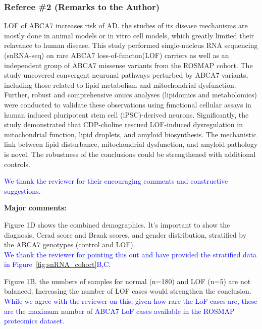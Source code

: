 \subsubsection*{Referee \#2 (Remarks to the Author)}
LOF of ABCA7 increases risk of AD. the studies of its disease mechanisms are mostly done in animal models or in vitro cell models, which greatly limited their relavance to human disease. This study performed single-nucleus RNA sequencing (snRNA-seq) on rare ABCA7 loss-of-functon(LOF) carriers as well as an independent group of ABCA7 missense variants from the ROSMAP cohort. The study uncovered convergent neuronal pathways perturbed by ABCA7 variants, including those related to lipid metabolism and mitochondrial dysfunction. Further, robust and comprehensive omics analyses (lipidomics and metabolomics) were conducted to validate these observations using functional cellular assays in human induced pluripotent stem cell (iPSC)-derived neurons. Significantly, the study demonstrated that CDP-choline rescued LOF-induced dysregulation in mitochondrial function, lipid droplets, and amyloid biosynthesis. The mechanistic link between lipid disturbance, mitochondrial dysfunction, and amyloid pathology is novel. The robustness of the conclusions could be strengthened with additional controls.

\textcolor{blue}{We thank the reviewer for their encouraging comments and constructive suggestions.}

\textbf{Major comments:}

Figure 1D shows the combined demographics. It’s important to show the diagnosis, Cerad score and Braak scores, and gender distribution, stratified by the ABCA7 genotypes (control and LOF).\\
\textcolor{blue}{We thank the reviewer for pointing this out and have provided the stratified data in Figure~\ref{fig:snRNA_cohort}B,C.}

Figure 1B, the numbers of samples for normal (n=180) and LOF (n=5) are not balanced. Increasing the number of LOF cases would strengthen the conclusion.\\
\textcolor{blue}{While we agree with the reviewer on this, given how rare the LoF cases are, these are the maximum number of ABCA7 LoF cases available in the ROSMAP proteomics dataset.}

